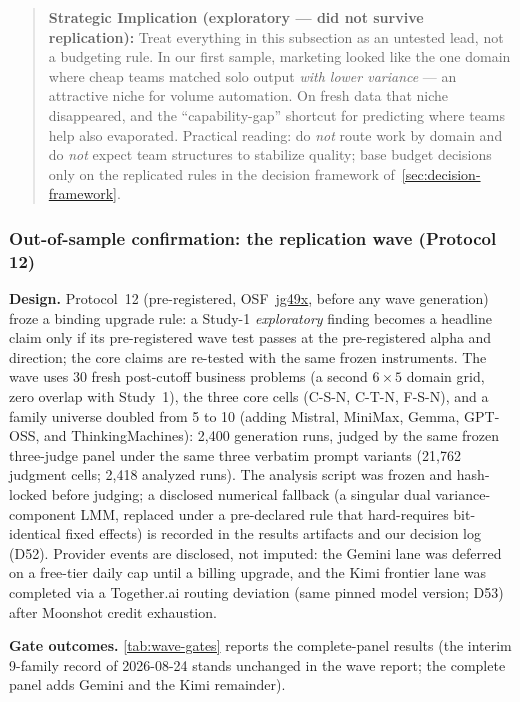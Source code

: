 \documentclass[12pt,a4paper]{article}
\begin{document}
\begin{quote}
\textbf{Strategic Implication (exploratory --- did not survive replication):}
Treat everything in this subsection as an untested lead, not a budgeting rule.
In our first sample, marketing looked like the one domain where cheap teams
matched solo output \emph{with lower variance} --- an attractive niche for
volume automation. On fresh data that niche disappeared, and the
``capability-gap'' shortcut for predicting where teams help also evaporated.
Practical reading: do \emph{not} route work by domain and do \emph{not} expect
team structures to stabilize quality; base budget decisions only on the
replicated rules in the decision framework of~\cref{sec:decision-framework}.
\end{quote}

\subsubsection{Out-of-sample confirmation: the replication wave (Protocol 12)}\label{sec:wave}

\textbf{Design.} Protocol~12 (pre-registered, OSF~\href{https://osf.io/jg49x}{jg49x},
before any wave generation) froze a binding upgrade rule: a Study-1
\emph{exploratory} finding becomes a headline claim only if its pre-registered
wave test passes at the pre-registered alpha and direction; the core claims are
re-tested with the same frozen instruments. The wave uses 30 fresh post-cutoff
business problems (a second $6 \times 5$ domain grid, zero overlap with
Study~1), the three core cells (C-S-N, C-T-N, F-S-N), and a family universe
doubled from 5 to 10 (adding Mistral, MiniMax, Gemma, GPT-OSS, and
ThinkingMachines): 2{,}400 generation runs, judged by the same frozen
three-judge panel under the same three verbatim prompt variants
(21{,}762 judgment cells; 2{,}418 analyzed runs). The analysis script was
frozen and hash-locked before judging; a disclosed numerical fallback (a
singular dual variance-component LMM, replaced under a pre-declared rule that
hard-requires bit-identical fixed effects) is recorded in the results artifacts
and our decision log (D52). Provider events are disclosed, not imputed: the
Gemini lane was deferred on a free-tier daily cap until a billing upgrade, and
the Kimi frontier lane was completed via a Together.ai routing deviation
(same pinned model version; D53) after Moonshot credit exhaustion.

\textbf{Gate outcomes.} \cref{tab:wave-gates} reports the complete-panel
results (the interim 9-family record of 2026-08-24 stands unchanged in the
wave report; the complete panel adds Gemini and the Kimi remainder).
\end{document}
